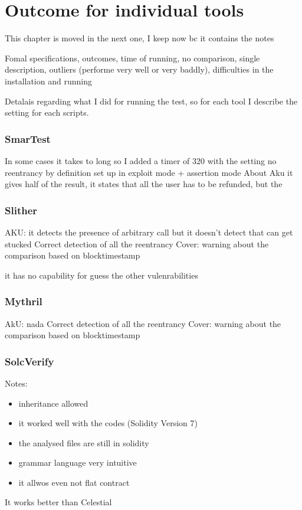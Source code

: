 \chapter{Outcome for individual tools}
\label{ch:Running}

This chapter is moved in the next one, I keep now bc it contains the notes

Fomal specifications, outcomes, time of running, no comparison, single description, outliers (performe very well or very baddly), 
difficulties in the installation and running 


Detalais regarding what I did for running the test, so for each tool I describe the setting for each scripts.
\subsection{SmarTest}
In some cases it takes to long so I added a timer of 320 with the setting 
no reentrancy by definition 
set up in exploit mode + assertion mode 
About Aku it gives half of the result, it states that all the user has to be refunded, but the

\subsection{Slither}
AKU: it detects the presence of arbitrary call but it doesn't detect that can get stucked 
Correct detection of all the reentrancy 
Cover: warning about the comparison based on blocktimestamp 

it has no capability for guess the other vulenrabilities 

\subsection{Mythril}

AkU: nada 
Correct detection of all the reentrancy 
Cover: warning about the comparison based on blocktimestamp 

\subsection{SolcVerify}
Notes:
\begin{itemize}
    \item inheritance allowed 
    \item it worked well with the codes (Solidity Version 7)
    \item the analysed files are still in solidity 
    \item grammar language very intuitive 
    \item it allwos even not flat contract 
\end{itemize}
It works better than Celestial 

